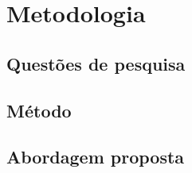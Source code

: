 
\chapter{Metodologia}\label{cap:Metodologia}

\section{Questões de pesquisa}

\section{Método}

\section{Abordagem proposta}

